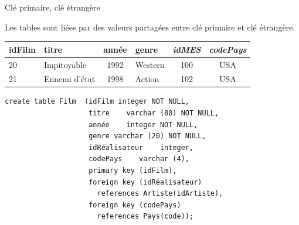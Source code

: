 \begin{frame}[fragile]{Clé primaire, clé étrangère}

Les tables sont liées par des valeurs partagées entre clé primaire
et clé étrangère.

\vfill

\begin{small}
\begin{tabular}{l|l|c|l|c|c}
\textbf{idFilm} & titre & année  & genre & \textit{idMES} & \textit{codePays}\\
\hline
20 & Impitoyable & 1992 & Western & 100 & USA \\
21 & Ennemi d'état & 1998 & Action & 102 & USA\\
\hline
\end{tabular}
\end{small}
\vfill


\vfill

\begin{verbatim}
create table Film  (idFilm integer NOT NULL,
                    titre    varchar (80) NOT NULL,
                    année    integer NOT NULL,
                    genre varchar (20) NOT NULL,
                    idRéalisateur    integer,
                    codePays    varchar (4),
                    primary key (idFilm),
                    foreign key (idRéalisateur) 
                      references Artiste(idArtiste),
                    foreign key (codePays) 
                      references Pays(code));

\end{verbatim}

\end{frame}

